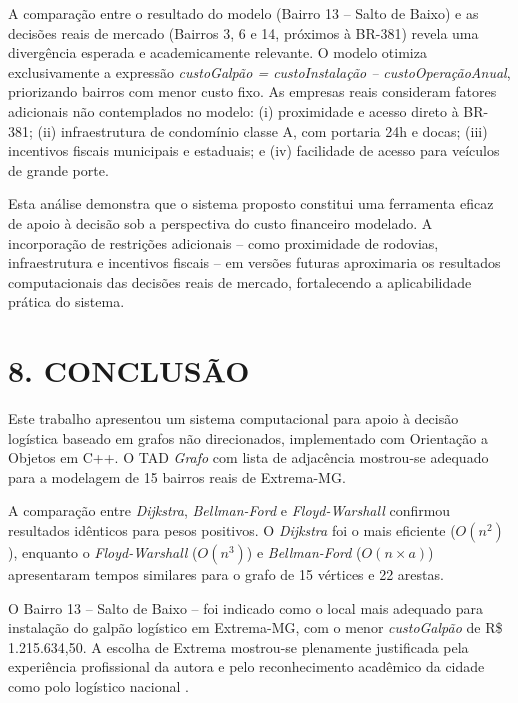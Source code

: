 \documentclass[12pt, a4paper]{article}
\begin{document}
A comparação entre o resultado do modelo (Bairro 13 -- Salto de Baixo) e as decisões reais de mercado (Bairros 3, 6 e 14, próximos à BR-381) revela uma divergência esperada e academicamente relevante. O modelo otimiza exclusivamente a expressão \textit{custoGalpão = custoInstalação -- custoOperaçãoAnual}, priorizando bairros com menor custo fixo. As empresas reais consideram fatores adicionais não contemplados no modelo: (i) proximidade e acesso direto à BR-381; (ii) infraestrutura de condomínio classe A, com portaria 24h e docas; (iii) incentivos fiscais municipais e estaduais; e (iv) facilidade de acesso para veículos de grande porte.

Esta análise demonstra que o sistema proposto constitui uma ferramenta eficaz de apoio à decisão sob a perspectiva do custo financeiro modelado. A incorporação de restrições adicionais -- como proximidade de rodovias, infraestrutura e incentivos fiscais -- em versões futuras aproximaria os resultados computacionais das decisões reais de mercado, fortalecendo a aplicabilidade prática do sistema.

\clearpage
\section*{8. CONCLUSÃO}

Este trabalho apresentou um sistema computacional para apoio à decisão logística baseado em grafos não direcionados, implementado com Orientação a Objetos em C++. O TAD \textit{Grafo} com lista de adjacência mostrou-se adequado para a modelagem de 15 bairros reais de Extrema-MG.

A comparação entre \textit{Dijkstra}, \textit{Bellman-Ford} e \textit{Floyd-Warshall} confirmou resultados idênticos para pesos positivos. O \textit{Dijkstra} foi o mais eficiente ($O(n^2)$), enquanto o \textit{Floyd-Warshall} ($O(n^3)$) e \textit{Bellman-Ford} ($O(n \times a)$) apresentaram tempos similares para o grafo de 15 vértices e 22 arestas.

O Bairro 13 -- Salto de Baixo -- foi indicado como o local mais adequado para instalação do galpão logístico em Extrema-MG, com o menor \textit{custoGalp\~ao} de R\$ 1.215.634,50. A escolha de Extrema mostrou-se plenamente justificada pela experiência profissional da autora e pelo reconhecimento acadêmico da cidade como polo logístico nacional \cite{cushman2022, gala2023, venceslau2024, ecommerce2023}.
\end{document}
